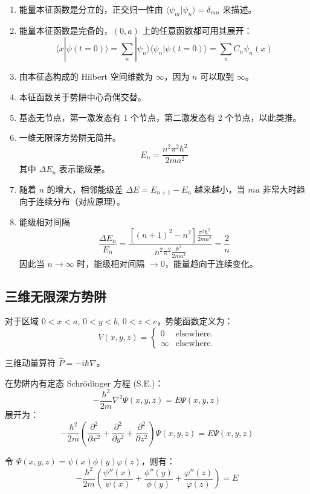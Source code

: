 \documentclass[lang=cn,15pt]{elegantbook}
\begin{document}
\begin{enumerate}
	\item 能量本征函数是分立的，正交归一性由 $\langle \psi_m | \psi_n \rangle = \delta_{mn}$ 来描述。
	\item 能量本征函数是完备的，$(0, a)$ 上的任意函数都可用其展开：
	\[
	\langle x | \psi(t=0) \rangle = \sum_n | \psi_n \rangle \langle \psi_n | \psi(t=0) \rangle = \sum_n C_n \psi_n(x)
	\]
	\item 由本征态构成的 Hilbert 空间维数为 $\infty$，因为 $n$ 可以取到 $\infty$。
	\item 本征函数关于势阱中心奇偶交替。
	\item 基态无节点，第一激发态有 1 个节点，第二激发态有 2 个节点，以此类推。
	\item 一维无限深方势阱无简并。
	\[
	E_n = \frac{n^2 \pi^2 \hbar^2}{2ma^2}
	\]
	其中 $\Delta E_n$ 表示能级差。
	
	\item 随着 $n$ 的增大，相邻能级差 $\Delta E = E_{n+1} - E_n$ 越来越小，当 $ma$ 非常大时趋向于连续分布（对应原理）。
	
	\item 能级相对间隔
	\[
	\frac{\Delta E_n}{E_n} = \frac{\left[(n+1)^2 - n^2\right] \frac{\pi^2 \hbar^2}{2ma^2}}{n^2 \pi^2 \frac{\hbar^2}{2ma^2}} = \frac{2}{n}
	\]
	因此当 $n \rightarrow \infty$ 时，能级相对间隔 $\rightarrow 0$，能量趋向于连续变化。
\end{enumerate}

\subsection{三维无限深方势阱}
对于区域 $0 < x < a$, $0 < y < b$, $0 < z < c$，势能函数定义为：
\[
V(x,y,z) = 
\begin{cases} 
	0 & \text{elsewhere.} \\
	\infty & \text{elsewhere.}
\end{cases}
\]

三维动量算符 $\hat{P} = -i\hbar\nabla$。

在势阱内有定态 Schrödinger 方程 (S.E.)：
\[
-\frac{\hbar^2}{2m} \nabla^2 \Psi(x,y,z) = E \Psi(x,y,z)
\]
展开为：
\[
-\frac{\hbar^2}{2m} \left( \frac{\partial^2}{\partial x^2} + \frac{\partial^2}{\partial y^2} + \frac{\partial^2}{\partial z^2} \right) \Psi(x,y,z) = E \Psi(x,y,z)
\]

令 $\Psi(x,y,z) = \psi(x) \phi(y) \varphi(z)$，则有：
\[
-\frac{\hbar^2}{2m} \left( \frac{\psi''(x)}{\psi(x)} + \frac{\phi''(y)}{\phi(y)} + \frac{\varphi''(z)}{\varphi(z)} \right) = E
\]
\end{document}
